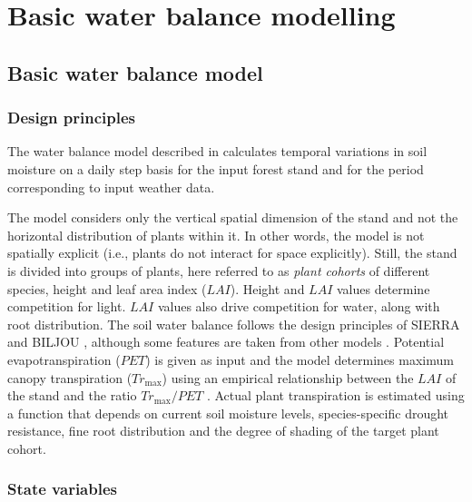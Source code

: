 \documentclass[]{book}
\begin{document}
\hypertarget{part-basic-water-balance-modelling}{%
\part{Basic water balance modelling}\label{part-basic-water-balance-modelling}}

\hypertarget{basic-water-balance-model}{%
\chapter{Basic water balance model}\label{basic-water-balance-model}}

\hypertarget{design-principles}{%
\section{Design principles}\label{design-principles}}

The water balance model described in \citet{DeCaceres2015} calculates temporal variations in soil moisture on a daily step basis for the input forest stand and for the period corresponding to input weather data.

The model considers only the vertical spatial dimension of the stand and not the horizontal distribution of
plants within it. In other words, the model is not spatially explicit (i.e., plants do not interact for space explicitly). Still, the stand is divided into groups of plants, here referred to as \emph{plant cohorts} of different species, height and leaf area index (\(LAI\)). Height and \(LAI\) values determine competition for light. \(LAI\) values also drive competition for water, along with root distribution. The soil water balance follows the design principles of SIERRA \citep{Mouillot2001, Ruffault2014, Ruffault2013} and BILJOU \citetext{\citealp{Granier1999}; \citeyear{Granier2007}}, although some features are taken from other models \citep{Kergoat1998}. Potential evapotranspiration (\(PET\)) is given as input and the model determines maximum canopy transpiration (\(Tr_{\max}\)) using an empirical relationship between the \(LAI\) of the stand and the ratio \(Tr_{\max}/PET\) \citep{Granier1999}. Actual plant transpiration is estimated using a function that depends on current soil moisture levels, species-specific drought resistance, fine root distribution and the degree of shading of the target plant cohort.

\hypertarget{state-variables}{%
\section{State variables}\label{state-variables}}
\end{document}
